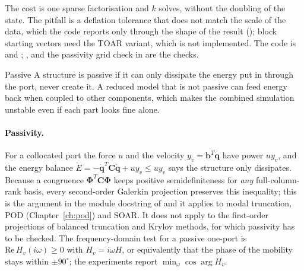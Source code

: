 The cost is one sparse factorisation and $k$ solves, without the doubling of the state. The pitfall is a deflation tolerance that does not match the scale of the data, which the code reports only through the shape of the result (); block starting vectors need the TOAR variant, which is not implemented. The code is  and ; ,  and the passivity grid check in  are the checks.

\begin{sidenote}{Passive}
A structure is passive if it can only dissipate the energy put in through the port, never create it. A reduced model that is not passive can feed energy back when coupled to other components, which makes the combined simulation unstable even if each part looks fine alone.
\end{sidenote}

\paragraph{Passivity.}
For a collocated port the force $u$ and the velocity $y_v=\bm b^T\dot{\bm q}$ have power $uy_v$, and the energy balance $\dot E=-\dot{\bm q}^T\bm C\dot{\bm q}+uy_v\le uy_v$ says the structure only dissipates. Because a congruence $\bm\Phi^T\bm C\bm\Phi$ keeps positive semidefiniteness for \emph{any} full-column-rank basis, every second-order Galerkin projection preserves this inequality; this is the argument in the module docstring of  and it applies to modal truncation, POD (Chapter~\ref{ch:pod}) and SOAR. It does not apply to the first-order projections of balanced truncation and Krylov methods, for which passivity has to be checked. The frequency-domain test for a passive one-port is $\mathrm{Re}\,H_v(i\omega)\ge0$ with $H_v=i\omega H$, or equivalently that the phase of the mobility stays within $\pm90^\circ$; the experiments report $\min_\omega\cos\arg H_v$.


